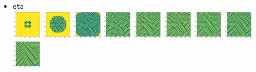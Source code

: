 \begin{itemize}
\item {\tt eta}\\
\includegraphics[height=1.4cm]{python_codes/fieldstone_171/pearson93_rand/eta_solution_0001000_u}
\includegraphics[height=1.4cm]{python_codes/fieldstone_171/pearson93_rand/eta_solution_0005000_u}
\includegraphics[height=1.4cm]{python_codes/fieldstone_171/pearson93_rand/eta_solution_0010000_u}
\includegraphics[height=1.4cm]{python_codes/fieldstone_171/pearson93_rand/eta_solution_0015000_u}
\includegraphics[height=1.4cm]{python_codes/fieldstone_171/pearson93_rand/eta_solution_0020000_u}
\includegraphics[height=1.4cm]{python_codes/fieldstone_171/pearson93_rand/eta_solution_0030000_u}
\includegraphics[height=1.4cm]{python_codes/fieldstone_171/pearson93_rand/eta_solution_0040000_u}
\includegraphics[height=1.4cm]{python_codes/fieldstone_171/pearson93_rand/eta_solution_0050000_u}
\includegraphics[height=1.4cm]{python_codes/fieldstone_171/pearson93_rand/eta_solution_final_u}\\

\end{itemize}
